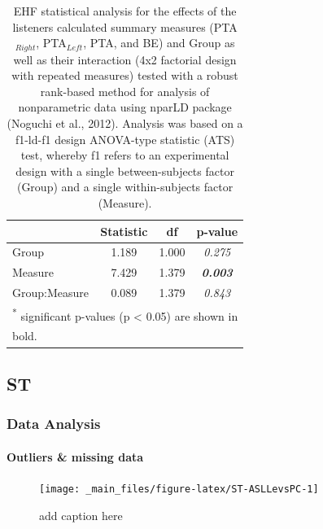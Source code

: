 \documentclass[a4paper, twoside]{templates/ociamthesis}
\begin{document}
\begin{table}

\caption{\label{tab:EHF-PTATabnparLD}EHF statistical analysis for the effects of the listeners calculated summary measures (PTA$_{Right}$, PTA$_{Left}$, PTA, and BE) and Group as well as their interaction (4x2 factorial design with repeated measures) tested with a robust rank-based method for analysis of nonparametric data using nparLD package (Noguchi et al., 2012). Analysis was based on a f1-ld-f1 design ANOVA-type statistic (ATS) test, whereby f1 refers to an experimental design with a single between-subjects factor (Group) and a single within-subjects factor (Measure).}
\centering
\begin{tabular}[t]{lcc>{}c}
\toprule
  & Statistic & df & p-value\\
\midrule
Group & 1.189 & 1.000 & \em{0.275}\\
Measure & 7.429 & 1.379 & \em{\textbf{0.003}}\\
Group:Measure & 0.089 & 1.379 & \em{0.843}\\
\bottomrule
\multicolumn{4}{l}{\textsuperscript{*} significant p-values (p < 0.05) are shown in}\\
\multicolumn{4}{l}{bold.}\\
\end{tabular}
\end{table}

\hypertarget{st}{%
\subsection{ST}\label{st}}

\hypertarget{data-analysis}{%
\subsubsection*{Data Analysis}\label{data-analysis}}

\hypertarget{outliers-missing-data}{%
\paragraph*{Outliers \& missing data}\label{outliers-missing-data}}

\begin{figure}
\texttt{[image: \_main\_files/figure-latex/ST-ASLLevsPC-1]} \caption{add caption here}\label{fig:ST-ASLLevsPC}
\end{figure}
\end{document}
